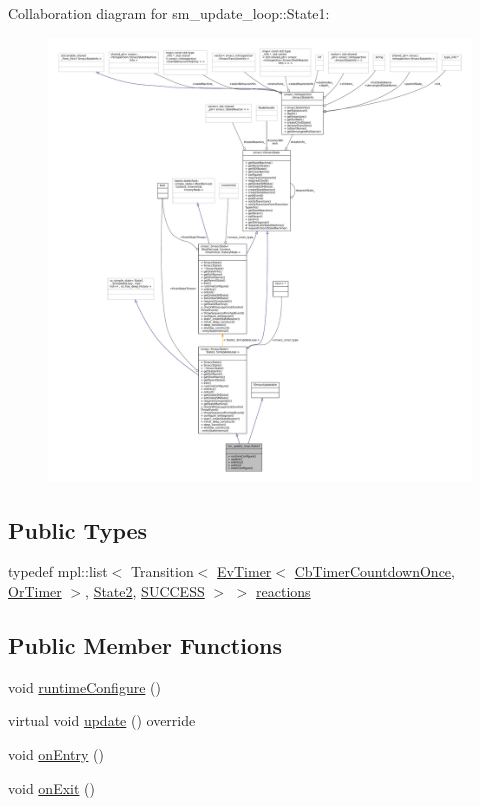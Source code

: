 Collaboration diagram for sm\+\_\+update\+\_\+loop\+:\+:State1\+:
\nopagebreak
\begin{figure}[H]
\begin{center}
\leavevmode
\includegraphics[width=350pt]{structsm__update__loop_1_1State1__coll__graph}
\end{center}
\end{figure}
\subsection*{Public Types}
\begin{DoxyCompactItemize}
\item 
typedef mpl\+::list$<$ Transition$<$ \hyperlink{structcl__ros__timer_1_1EvTimer}{Ev\+Timer}$<$ \hyperlink{classcl__ros__timer_1_1CbTimerCountdownOnce}{Cb\+Timer\+Countdown\+Once}, \hyperlink{classsm__update__loop_1_1OrTimer}{Or\+Timer} $>$, \hyperlink{structsm__update__loop_1_1State2}{State2}, \hyperlink{structsmacc_1_1default__transition__tags_1_1SUCCESS}{S\+U\+C\+C\+E\+SS} $>$ $>$ \hyperlink{structsm__update__loop_1_1State1_a828232579aa51d4fbfe9858c2a7016ad}{reactions}
\end{DoxyCompactItemize}
\subsection*{Public Member Functions}
\begin{DoxyCompactItemize}
\item 
void \hyperlink{structsm__update__loop_1_1State1_a9a4c0a2a171bc9c2d7686562000075b4}{runtime\+Configure} ()
\item 
virtual void \hyperlink{structsm__update__loop_1_1State1_ad31e8291e9ca0d1a4d9dbb76d929c01e}{update} () override
\item 
void \hyperlink{structsm__update__loop_1_1State1_afe6d5093ec6050053da6ecf9c7f6c238}{on\+Entry} ()
\item 
void \hyperlink{structsm__update__loop_1_1State1_a2d7e2107e2a2d157bb6a7b2f4f0f7c2c}{on\+Exit} ()
\end{DoxyCompactItemize}
